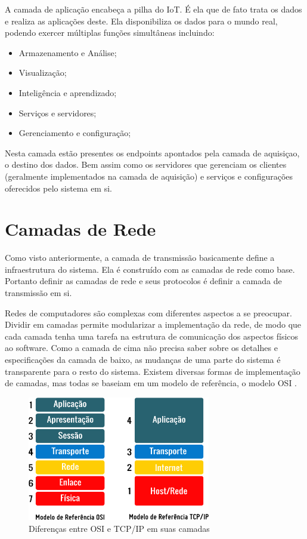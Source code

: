 A camada de aplicação encabeça a pilha do IoT. É ela que de fato trata os dados e realiza as aplicações deste. Ela disponibiliza os dados para o mundo real, podendo exercer múltiplas funções simultâneas incluindo:

\begin{itemize}
\item Armazenamento e Análise;
\item Visualização; 
\item Inteligência e aprendizado;
\item Serviços e servidores;
\item Gerenciamento e configuração;
\end{itemize}

Nesta camada estão presentes os endpoints apontados pela camada de aquisiçao, o destino dos dados. Bem assim como os servidores que gerenciam os clientes (geralmente implementados na camada de aquisição) e serviços e configurações oferecidos pelo sistema em si.

\section{Camadas de Rede}
\label{section:camadas_de_rede}

Como visto anteriormente, a camada de transmissão basicamente define a infraestrutura do sistema. Ela é construído com as camadas de rede como base. Portanto definir as camadas de rede e seus protocolos é definir a camada de transmissão em si.

Redes de computadores são complexas com diferentes aspectos a se preocupar. Dividir em camadas permite modularizar a implementação da rede, de modo que cada camada tenha uma tarefa na estrutura de comunicação dos aspectos físicos ao software. Como a camada de cima não precisa saber sobre os detalhes e especificações da camada de baixo, as mudanças de uma parte do sistema é transparente para o resto do sistema. Existem diversas formas de implementação de camadas, mas todas se baseiam em um modelo de referência, o modelo OSI \cite{Zimmermann:1988:ORM:59309.59310}.


\begin{figure}[h!]
\centering
\includegraphics[width=8cm]{./02_Capitulos/02_Cap1/figures/modelo_osi_tcpip}
\caption{Diferenças entre OSI e TCP/IP em suas camadas}
\label{fig:1.2.0/modelo_osi_tcpip}
\end{figure}

